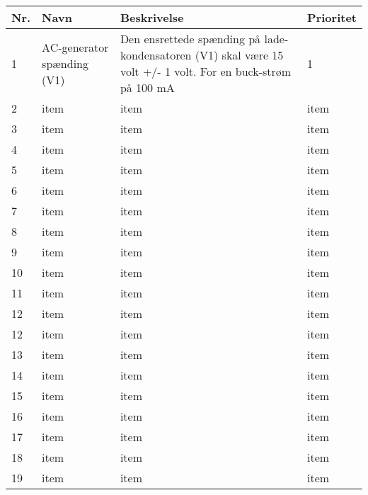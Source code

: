 \documentclass[../main.tex]{subfiles}
\begin{document}
\renewcommand{\arraystretch}{1.3}
    \begin{tabular}{|l|l|p{}|l|}
 \hline
 \rowcolors{HTML}{c0c0c0c0}\textbf{Nr.} & \textbf{Navn} & \textbf{Beskrivelse} &\textbf{Prioritet}\\
 \hline
  1  & AC-generator spænding (V1) & Den ensrettede spænding på lade-
kondensatoren (V1) skal være 15
volt +/- 1 volt. For en buck-strøm på
100 mA & 1 \\
 \hline
 2  & item  & item & item \\
 \hline
 3  & item  & item & item \\
 \hline
 4  & item  & item & item \\
 \hline
 5  & item  & item & item \\
 \hline
 6  & item  & item & item \\
 \hline
 7  & item  & item & item \\
 \hline
 8  & item  & item & item \\
 \hline
 9  & item  & item & item \\
 \hline
 10  & item  & item & item \\
 \hline
 11  & item  & item & item \\
 \hline
 12  & item  & item & item \\
 \hline
 12  & item  & item & item \\
 \hline
 13  & item  & item & item \\
 \hline
 14  & item  & item & item \\
 \hline
 15  & item  & item & item \\
 \hline
 16  & item  & item & item \\
 \hline
 17  & item  & item & item \\
 \hline
 18  & item  & item & item \\
 \hline
 19  & item  & item & item \\
\hline
    \end{tabular}
\end{document}
